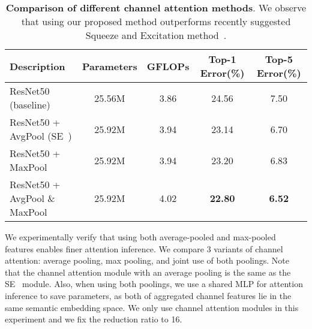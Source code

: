 \documentclass[runningheads]{llncs}
\begin{document}
\begin{table}[b]
\begin{center}
\begin{adjustbox}{max width=\textwidth}
\begin{tabular}{ l|c|c|c|c }
\hline
Description & Parameters & GFLOPs & Top-1 Error(\%) & Top-5 Error(\%) \\
\hline
\hline
ResNet50 (baseline)                           & 25.56M                & 3.86          
                                                    & 24.56   &   7.50\\
ResNet50 + AvgPool (SE~\cite{hu2017squeeze})    & 25.92M    & 3.94
                                                    & 23.14  &   6.70\\
\hline
ResNet50 + MaxPool                            & 25.92M    & 3.94  
                                                    & 23.20  &   6.83\\
ResNet50 + AvgPool \& MaxPool                 & 25.92M    & 4.02  
                                                    &  \textbf{22.80}  &   \textbf{6.52}\\
\hline
\end{tabular}
\end{adjustbox}
\end{center}
\caption{\textbf{Comparison of different channel attention methods}. We observe that using our proposed method outperforms recently suggested Squeeze and Excitation method~\cite{hu2017squeeze}.} 
\label{table:Ablation_channel}
\end{table}

We experimentally verify that using both average-pooled and max-pooled features enables finer attention inference. We compare 3 variants of channel attention: average pooling, max pooling, and joint use of both poolings. Note that the channel attention module with an average pooling is the same as the SE~\cite{hu2017squeeze} module. Also, when using both poolings, we use a shared MLP for attention inference to save parameters, as both of aggregated channel features lie in the same semantic embedding space. We only use channel attention modules in this experiment and we fix the reduction ratio to 16.
\end{document}
